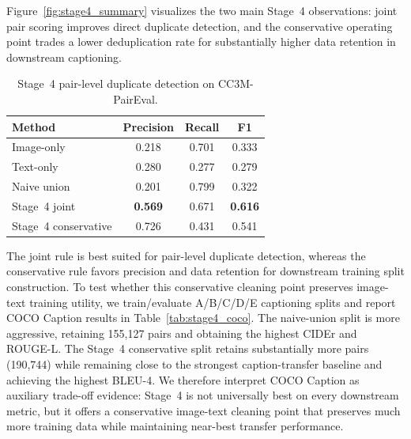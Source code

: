 \documentclass[conference]{IEEEtran}
\renewcommand{\arraystretch}{1.15}
\begin{document}
Figure~\ref{fig:stage4_summary} visualizes the two main Stage~4 observations: joint pair scoring improves direct duplicate detection, and the conservative operating point trades a lower deduplication rate for substantially higher data retention in downstream captioning.

\begin{table}[t]
\caption{Stage~4 pair-level duplicate detection on CC3M-PairEval.}
\label{tab:stage4_pair}
\centering
\small
\setlength{\tabcolsep}{4pt}
\renewcommand{\arraystretch}{1.12}
\begin{tabular}{lccc}
\toprule
\textbf{Method} & \textbf{Precision} & \textbf{Recall} & \textbf{F1} \\
\midrule
Image-only & 0.218 & 0.701 & 0.333 \\
Text-only & 0.280 & 0.277 & 0.279 \\
Naive union & 0.201 & 0.799 & 0.322 \\
Stage~4 joint & \textbf{0.569} & 0.671 & \textbf{0.616} \\
Stage~4 conservative & 0.726 & 0.431 & 0.541 \\
\bottomrule
\end{tabular}
\end{table}

The joint rule is best suited for pair-level duplicate detection, whereas the conservative rule favors precision and data retention for downstream training split construction. To test whether this conservative cleaning point preserves image-text training utility, we train/evaluate A/B/C/D/E captioning splits and report COCO Caption results in Table~\ref{tab:stage4_coco}. The naive-union split is more aggressive, retaining 155,127 pairs and obtaining the highest CIDEr and ROUGE-L. The Stage~4 conservative split retains substantially more pairs (190,744) while remaining close to the strongest caption-transfer baseline and achieving the highest BLEU-4. We therefore interpret COCO Caption as auxiliary trade-off evidence: Stage~4 is not universally best on every downstream metric, but it offers a conservative image-text cleaning point that preserves much more training data while maintaining near-best transfer performance.
\end{document}
